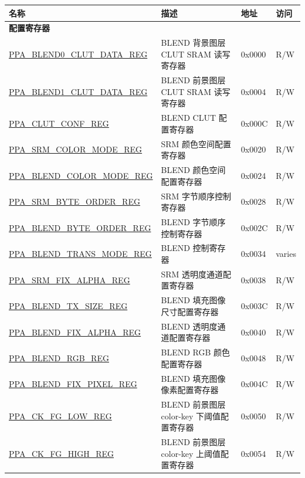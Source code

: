 \begin{longtable}{ | p{6cm} | p{7.2cm} | p{1.3cm} | p{1cm} | }
\hline\rowcolor{lightgray}
名称 & 描述 &  地址 & 访问 \\ \hline
\endhead
\multicolumn{4}{|l|}{\textbf{配置寄存器}} \\ \hline
\hyperref[regdesc:PPABLEND0CLUTDATAREG]{PPA\_BLEND0\_CLUT\_DATA\_REG} & BLEND 背景图层 CLUT SRAM 读写寄存器 & 0x0000 & R/W \\ \hline
\hyperref[regdesc:PPABLEND1CLUTDATAREG]{PPA\_BLEND1\_CLUT\_DATA\_REG} & BLEND 前景图层 CLUT SRAM 读写寄存器 & 0x0004 & R/W \\ \hline
\hyperref[regdesc:PPACLUTCONFREG]{PPA\_CLUT\_CONF\_REG} & BLEND CLUT 配置寄存器 & 0x000C & R/W \\ \hline
\hyperref[regdesc:PPASRMCOLORMODEREG]{PPA\_SRM\_COLOR\_MODE\_REG} & SRM 颜色空间配置寄存器 & 0x0020 & R/W \\ \hline
\hyperref[regdesc:PPABLENDCOLORMODEREG]{PPA\_BLEND\_COLOR\_MODE\_REG} & BLEND 颜色空间配置寄存器 & 0x0024 & R/W \\ \hline
\hyperref[regdesc:PPASRMBYTEORDERREG]{PPA\_SRM\_BYTE\_ORDER\_REG} & SRM 字节顺序控制寄存器 & 0x0028 & R/W \\ \hline
\hyperref[regdesc:PPABLENDBYTEORDERREG]{PPA\_BLEND\_BYTE\_ORDER\_REG} & BLEND 字节顺序控制寄存器 & 0x002C & R/W \\ \hline
\hyperref[regdesc:PPABLENDTRANSMODEREG]{PPA\_BLEND\_TRANS\_MODE\_REG} & BLEND 控制寄存器 & 0x0034 & varies \\ \hline
\hyperref[regdesc:PPASRMFIXALPHAREG]{PPA\_SRM\_FIX\_ALPHA\_REG} & SRM 透明度通道配置寄存器 & 0x0038 & R/W \\ \hline
\hyperref[regdesc:PPABLENDTXSIZEREG]{PPA\_BLEND\_TX\_SIZE\_REG} & BLEND 填充图像尺寸配置寄存器 & 0x003C & R/W \\ \hline
\hyperref[regdesc:PPABLENDFIXALPHAREG]{PPA\_BLEND\_FIX\_ALPHA\_REG} & BLEND 透明度通道配置寄存器 & 0x0040 & R/W \\ \hline
\hyperref[regdesc:PPABLENDRGBREG]{PPA\_BLEND\_RGB\_REG} & BLEND RGB 颜色配置寄存器 & 0x0048 & R/W \\ \hline
\hyperref[regdesc:PPABLENDFIXPIXELREG]{PPA\_BLEND\_FIX\_PIXEL\_REG} & BLEND 填充图像像素配置寄存器 & 0x004C & R/W \\ \hline
\hyperref[regdesc:PPACKFGLOWREG]{PPA\_CK\_FG\_LOW\_REG} & BLEND 前景图层 color-key 下阈值配置寄存器 & 0x0050 & R/W \\ \hline
\hyperref[regdesc:PPACKFGHIGHREG]{PPA\_CK\_FG\_HIGH\_REG} & BLEND 前景图层 color-key 上阈值配置寄存器 & 0x0054 & R/W \\ \hline

\end{longtable}
